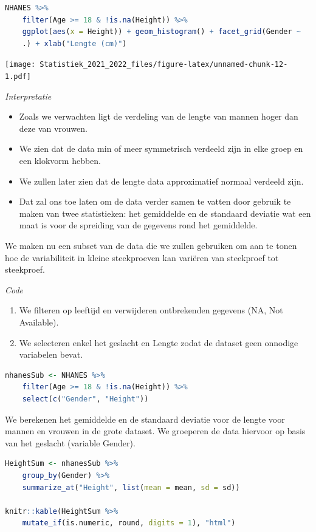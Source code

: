 \documentclass[
  12pt,dutch,coursenotes]{book}
\providecommand{\tightlist}{%
  \setlength{\itemsep}{0pt}\setlength{\parskip}{0pt}}
\theoremstyle{definition}
\theoremstyle{definition}
\theoremstyle{definition}
\theoremstyle{definition}
\theoremstyle{remark}
\begin{document}
\begin{lstlisting}[language=R]
NHANES %>%
    filter(Age >= 18 & !is.na(Height)) %>%
    ggplot(aes(x = Height)) + geom_histogram() + facet_grid(Gender ~
    .) + xlab("Lengte (cm)")
\end{lstlisting}

\texttt{[image: Statistiek\_2021\_2022\_files/figure-latex/unnamed-chunk-12-1.pdf]}

\emph{Interpretatie}

\begin{itemize}
\tightlist
\item
  Zoals we verwachten ligt de verdeling van de lengte van mannen hoger dan deze van vrouwen.
\item
  We zien dat de data min of meer symmetrisch verdeeld zijn in elke groep en een klokvorm hebben.
\item
  We zullen later zien dat de lengte data approximatief normaal verdeeld zijn.
\item
  Dat zal ons toe laten om de data verder samen te vatten door gebruik te maken van twee statistieken: het gemiddelde en de standaard deviatie wat een maat is voor de spreiding van de gegevens rond het gemiddelde.
\end{itemize}

We maken nu een subset van de data die we zullen gebruiken om aan te tonen hoe de variabiliteit in kleine steekproeven kan variëren van steekproef tot steekproef.

\emph{Code}

\begin{enumerate}
\def\labelenumi{\arabic{enumi}.}
\tightlist
\item
  We filteren op leeftijd en verwijderen ontbrekenden gegevens (NA, Not Available).
\item
  We selecteren enkel het geslacht en Lengte zodat de dataset geen onnodige variabelen bevat.
\end{enumerate}

\begin{lstlisting}[language=R]
nhanesSub <- NHANES %>%
    filter(Age >= 18 & !is.na(Height)) %>%
    select(c("Gender", "Height"))
\end{lstlisting}

We berekenen het gemiddelde en de standaard deviatie voor de lengte voor mannen en vrouwen in de grote dataset.
We groeperen de data hiervoor op basis van het geslacht (variable Gender).

\begin{lstlisting}[language=R]
HeightSum <- nhanesSub %>%
    group_by(Gender) %>%
    summarize_at("Height", list(mean = mean, sd = sd))

knitr::kable(HeightSum %>%
    mutate_if(is.numeric, round, digits = 1), "html")
\end{lstlisting}
\end{document}
